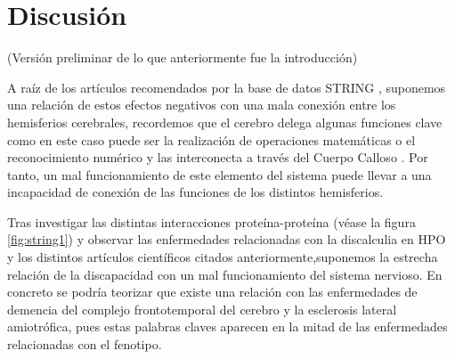 \section{Discusión}

(Versión preliminar de lo que anteriormente fue la introducción)

\hfill

A raíz de los artículos recomendados por la base de datos STRING \cite{Walterfang2014,frontotemporal}, suponemos una relación de estos efectos negativos con una mala conexión entre los hemisferios cerebrales, recordemos que el cerebro delega algunas funciones clave como en este caso puede ser la realización de operaciones matemáticas o el reconocimiento numérico y las interconecta a través del Cuerpo Calloso \cite{CorpusCallosum}. Por tanto, un mal funcionamiento de este elemento del sistema puede llevar a una incapacidad de conexión de las funciones de los distintos hemisferios.

\hfill

Tras investigar las distintas interacciones proteína-proteína (véase la figura \ref{fig:string1}) y observar las enfermedades relacionadas con la discalculia en HPO y los distintos artículos científicos citados anteriormente,suponemos la estrecha relación de la discapacidad con un mal funcionamiento del sistema nervioso. En concreto se podría teorizar que existe una relación con las enfermedades de demencia del complejo frontotemporal del cerebro y la esclerosis lateral amiotrófica, pues estas palabras claves aparecen en la mitad de las enfermedades relacionadas con el fenotipo.




\newpage